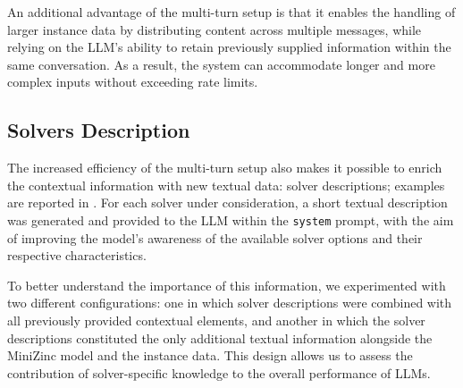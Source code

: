 \documentclass[../../main]{subfiles}
\begin{document}
An additional advantage of the multi-turn setup is that it enables the handling of larger instance data by distributing content across multiple messages, while relying on the LLM's ability to retain previously supplied information within the same conversation. As a result, the system can accommodate longer and more complex inputs without exceeding rate limits.

\subsection{Solvers Description} 
\label{sec:sDesc}
The increased efficiency of the multi-turn setup also makes it possible to enrich the contextual information with new textual data: solver descriptions; examples are reported in . For each solver under consideration, a short textual description was generated and provided to the LLM within the \texttt{system} prompt, with the aim of improving the model's awareness of the available solver options and their respective characteristics.

To better understand the importance of this information, we experimented with two different configurations: one in which solver descriptions were combined with all previously provided contextual elements, and another in which the solver descriptions constituted the only additional textual information alongside the MiniZinc model and the instance data. This design allows us to assess the contribution of solver-specific knowledge to the overall performance of LLMs.

\begin{table}[!ht]
    \centering
    \caption{Test with sanitized scripts combined with solvers description in a multi turn setup. Columns are calculated as in .}
    \label{tab:combinedSdesc}
\end{table}
\end{document}

